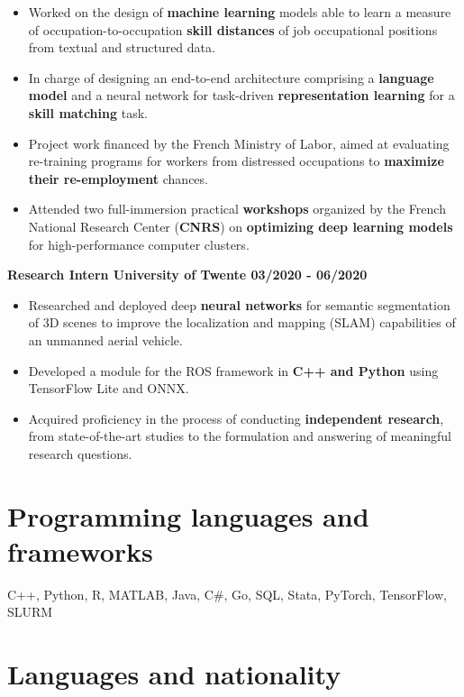 \documentclass[11pt, a4paper]{article}
\begin{document}
\begin{itemize}


\item
  Worked on the design of \textbf{machine learning} models able to
  learn a measure of occupation-to-occupation \textbf{skill distances}
  of job occupational positions from textual and structured data.
\item
  In charge of designing an end-to-end architecture comprising a
  \textbf{language model} and a neural network for task-driven
  \textbf{representation learning} for a \textbf{skill matching} task.
\item

  Project work financed by the French Ministry of Labor, 
  aimed at evaluating re-training programs for workers from distressed occupations to
  \textbf{maximize their re-employment} chances.
  \item
  
  Attended two full-immersion practical \textbf{workshops} organized by the French National Research Center (\textbf{CNRS}) on \textbf{optimizing deep learning models} for high-performance computer clusters.
  \end{itemize}
\textbf{Research Intern \hfill \hspace{1pt} University of Twente \textbar{} 03/2020 - 06/2020}
\begin{itemize}

\item
  Researched and deployed deep \textbf{neural networks} for semantic
  segmentation of 3D scenes to improve the localization and mapping
  (SLAM) capabilities of an unmanned aerial vehicle.
\item

  Developed a module for the ROS framework in \textbf{C++ and Python}
  using TensorFlow Lite and ONNX.
\item

  Acquired proficiency in the process of conducting \textbf{independent
  research}, from state-of-the-art studies to the formulation and
  answering of meaningful research questions.
\end{itemize}

\section*{Programming languages and frameworks}
C++, Python, R, MATLAB, Java, C\#, Go, SQL, Stata, PyTorch, TensorFlow, SLURM

\section*{Languages and nationality}
\end{document}
